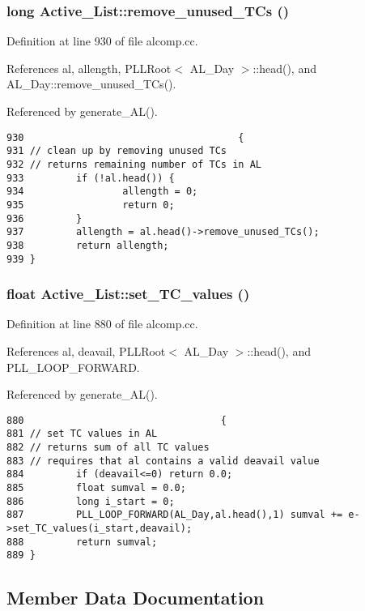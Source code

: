 \subsubsection{\setlength{\rightskip}{0pt plus 5cm}long Active\_\-List::remove\_\-unused\_\-TCs ()}\label{classActive__List_a15}




Definition at line 930 of file alcomp.cc.

References al, allength, PLLRoot$<$ AL\_\-Day $>$::head(), and AL\_\-Day::remove\_\-unused\_\-TCs().

Referenced by generate\_\-AL().



\footnotesize\begin{verbatim}930                                     {
931 // clean up by removing unused TCs
932 // returns remaining number of TCs in AL
933         if (!al.head()) {
934                 allength = 0;
935                 return 0;
936         }
937         allength = al.head()->remove_unused_TCs();
938         return allength;
939 }
\end{verbatim}\normalsize 
{}
\subsubsection{\setlength{\rightskip}{0pt plus 5cm}float Active\_\-List::set\_\-TC\_\-values ()}\label{classActive__List_a9}




Definition at line 880 of file alcomp.cc.

References al, deavail, PLLRoot$<$ AL\_\-Day $>$::head(), and PLL\_\-LOOP\_\-FORWARD.

Referenced by generate\_\-AL().



\footnotesize\begin{verbatim}880                                  {
881 // set TC values in AL
882 // returns sum of all TC values
883 // requires that al contains a valid deavail value
884         if (deavail<=0) return 0.0;
885         float sumval = 0.0;
886         long i_start = 0;
887         PLL_LOOP_FORWARD(AL_Day,al.head(),1) sumval += e->set_TC_values(i_start,deavail);
888         return sumval;
889 }
\end{verbatim}\normalsize 


\subsection{Member Data Documentation}
